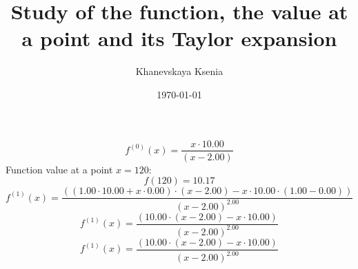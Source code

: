 \documentclass[12pt, letterpaper]{article}
\title {Study of the function, the value at a point and its Taylor expansion}
\author{Khanevskaya Ksenia}
\date{\today}
\begin{document}
\maketitle
\[f^{(0)}(x)=\frac{x \cdot 10.00}{(x-2.00)}\]
Function value at a point $x=120$: \[f(120)=10.17\]
\[f^{(1)}(x)=\frac{((1.00 \cdot 10.00+x \cdot 0.00) \cdot (x-2.00)-x \cdot 10.00 \cdot (1.00-0.00))}{(x-2.00)^{2.00}}\]
\[f^{(1)}(x)=\frac{(10.00 \cdot (x-2.00)-x \cdot 10.00)}{(x-2.00)^{2.00}}\]
\[f^{(1)}(x)=\frac{(10.00 \cdot (x-2.00)-x \cdot 10.00)}{(x-2.00)^{2.00}}\]
\end{document}
